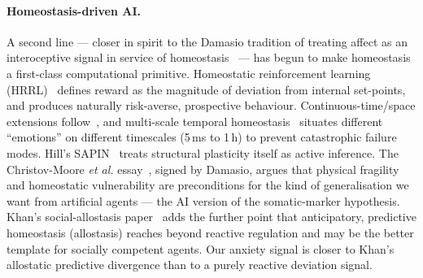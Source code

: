 \documentclass[pdflatex,sn-mathphys-num]{sn-jnl}
\theoremstyle{thmstyleone}
\theoremstyle{thmstylethree}
\begin{document}
\paragraph{Homeostasis-driven AI.} A second line --- closer in spirit to the Damasio tradition of treating affect as an interoceptive signal in service of homeostasis~\cite{damasio1999feeling, seth2018consciousness} --- has begun to make homeostasis a first-class computational primitive. Homeostatic reinforcement learning (HRRL)~\cite{yoshida2025hrrl} defines reward as the magnitude of deviation from internal set-points, and produces naturally risk-averse, prospective behaviour. Continuous-time/space extensions follow~\cite{laurencon2024ctcs}, and multi-scale temporal homeostasis~\cite{hakim2026msth} situates different ``emotions'' on different timescales (5\,ms to 1\,h) to prevent catastrophic failure modes. Hill's SAPIN~\cite{hill2025sapin} treats structural plasticity itself as active inference. The Christov-Moore \emph{et al.} essay~\cite{christov2025embodiment}, signed by Damasio, argues that physical fragility and homeostatic vulnerability are preconditions for the kind of generalisation we want from artificial agents --- the AI version of the somatic-marker hypothesis. Khan's social-allostasis paper~\cite{khan2025allostasis} adds the further point that anticipatory, predictive homeostasis (allostasis) reaches beyond reactive regulation and may be the better template for socially competent agents. Our anxiety signal is closer to Khan's allostatic predictive divergence than to a purely reactive deviation signal.
\end{document}

